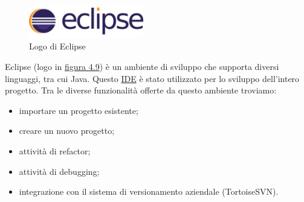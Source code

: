 \begin{figure}[!h]
	\centering
	\includegraphics[width=5cm]{../images/Eclipse-logo.png}
	\caption{Logo di Eclipse}
	\label{fig:eclipse}
\end{figure}

\noindent Eclipse (logo in {\hyperref[fig:eclipse]{figura 4.9}}) è un ambiente di sviluppo che supporta diversi linguaggi, tra cui Java. Questo {\hyperref[para:ide-definition]{IDE}}\glsfirstoccur \; è stato utilizzato per lo sviluppo dell'intero progetto.
Tra le diverse funzionalità offerte da questo ambiente troviamo:
\begin{itemize}
\item importare un progetto esistente;
\item creare un nuovo progetto;
\item attività di refactor;
\item attività di debugging;
\item integrazione con il sistema di versionamento aziendale (TortoiseSVN).
\end{itemize}
